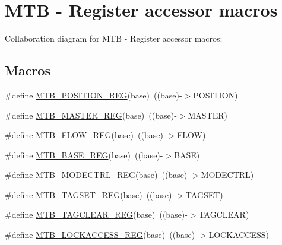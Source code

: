 \hypertarget{group___m_t_b___register___accessor___macros}{}\section{M\+TB -\/ Register accessor macros}
\label{group___m_t_b___register___accessor___macros}
Collaboration diagram for M\+TB -\/ Register accessor macros\+:
\subsection*{Macros}
\begin{DoxyCompactItemize}
\item 
\#define \hyperlink{group___m_t_b___register___accessor___macros_gab09a5c0d30a1ff9148269b45679f0a96}{M\+T\+B\+\_\+\+P\+O\+S\+I\+T\+I\+O\+N\+\_\+\+R\+EG}(base)~((base)-\/$>$P\+O\+S\+I\+T\+I\+ON)
\item 
\#define \hyperlink{group___m_t_b___register___accessor___macros_ga142ef5fc493afaf8160fe03488ff03a1}{M\+T\+B\+\_\+\+M\+A\+S\+T\+E\+R\+\_\+\+R\+EG}(base)~((base)-\/$>$M\+A\+S\+T\+ER)
\item 
\#define \hyperlink{group___m_t_b___register___accessor___macros_ga15b22e1ac15074a886967200ba55cb1f}{M\+T\+B\+\_\+\+F\+L\+O\+W\+\_\+\+R\+EG}(base)~((base)-\/$>$F\+L\+OW)
\item 
\#define \hyperlink{group___m_t_b___register___accessor___macros_gad5de83ac068d2c0100cf3d14c351a24a}{M\+T\+B\+\_\+\+B\+A\+S\+E\+\_\+\+R\+EG}(base)~((base)-\/$>$B\+A\+SE)
\item 
\#define \hyperlink{group___m_t_b___register___accessor___macros_ga6e6ab43aedd8d0a4ecd61b673f3dcfef}{M\+T\+B\+\_\+\+M\+O\+D\+E\+C\+T\+R\+L\+\_\+\+R\+EG}(base)~((base)-\/$>$M\+O\+D\+E\+C\+T\+RL)
\item 
\#define \hyperlink{group___m_t_b___register___accessor___macros_gabc0322acf08b1bcadb2cf2ec6f636dda}{M\+T\+B\+\_\+\+T\+A\+G\+S\+E\+T\+\_\+\+R\+EG}(base)~((base)-\/$>$T\+A\+G\+S\+ET)
\item 
\#define \hyperlink{group___m_t_b___register___accessor___macros_ga14fdf038658b290f905867b2b745c629}{M\+T\+B\+\_\+\+T\+A\+G\+C\+L\+E\+A\+R\+\_\+\+R\+EG}(base)~((base)-\/$>$T\+A\+G\+C\+L\+E\+AR)
\item 
\#define \hyperlink{group___m_t_b___register___accessor___macros_gaf0943d71afa518f65cec97557400a04a}{M\+T\+B\+\_\+\+L\+O\+C\+K\+A\+C\+C\+E\+S\+S\+\_\+\+R\+EG}(base)~((base)-\/$>$L\+O\+C\+K\+A\+C\+C\+E\+SS)
\item 

\end{DoxyCompactItemize}

